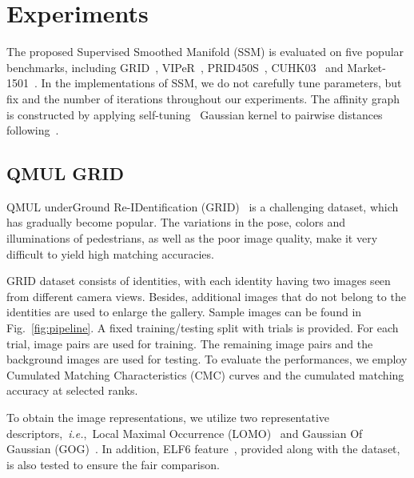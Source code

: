 \documentclass[10pt,twocolumn,letterpaper]{article}
\def\ie{\emph{i.e.}}
\begin{document}
\section{Experiments} \label{sec:exp}
The proposed Supervised Smoothed Manifold (SSM) is evaluated on five popular benchmarks, including GRID~\cite{GRID1,GRID2}, VIPeR~\cite{VIPeR_ELF}, PRID450S~\cite{PRID450S}, CUHK03~\cite{Deepreid} and Market-1501~\cite{market1501}.
In the implementations of SSM, we do not carefully tune parameters, but fix  and the number of iterations  throughout our experiments. The affinity graph is constructed by applying self-tuning~\cite{self-tuning} Gaussian kernel to pairwise distances following~\cite{person_manifold_ranking}.

\subsection{QMUL GRID}
QMUL underGround Re-IDentification (GRID)~\cite{GRID1,GRID2} is a challenging dataset, which has gradually become popular. The variations in the pose, colors and illuminations of pedestrians, as well as the poor image quality, make it very difficult to yield high matching accuracies.

GRID dataset consists of  identities, with each identity having two images seen from different camera views. Besides,  additional images that do not belong to the  identities are used to enlarge the gallery. Sample images can be found in Fig.~\ref{fig:pipeline}. A fixed training/testing split with  trials is provided. For each trial,  image pairs are used for training. The remaining  image pairs and the  background images are used for testing. To evaluate the performances, we employ Cumulated Matching Characteristics (CMC) curves and the cumulated matching accuracy at selected ranks.

To obtain the image representations, we utilize two representative descriptors,~\ie,~Local Maximal Occurrence (LOMO)~\cite{XQDA} and Gaussian Of Gaussian (GOG)~\cite{GOG}. In addition, ELF6 feature~\cite{ELF6}, provided along with the dataset, is also tested to ensure the fair comparison.
\end{document}
